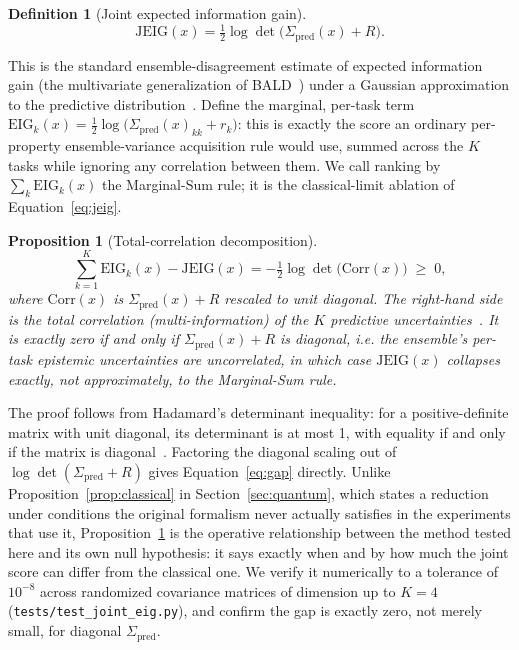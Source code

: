 \documentclass[10pt]{article}
\newtheorem{definition}{Definition}
\newtheorem{proposition}{Proposition}
\begin{document}
\begin{definition}[Joint expected information gain]\label{def:jeig}
\begin{equation}
\mathrm{JEIG}(x) = \tfrac{1}{2}\log\det\bigl(\Sigma_{\mathrm{pred}}(x) + R\bigr). \label{eq:jeig}
\end{equation}
\end{definition}
This is the standard ensemble-disagreement estimate of expected information gain (the multivariate generalization of BALD~\cite{houlsby2011bayesian}) under a Gaussian approximation to the predictive distribution~\cite{mackay1992information}. Define the marginal, per-task term $\mathrm{EIG}_k(x) = \tfrac{1}{2}\log\bigl(\Sigma_{\mathrm{pred}}(x)_{kk} + r_k\bigr)$: this is exactly the score an ordinary per-property ensemble-variance acquisition rule would use, summed across the $K$ tasks while ignoring any correlation between them. We call ranking by $\sum_k \mathrm{EIG}_k(x)$ the Marginal-Sum rule; it is the classical-limit ablation of Equation~\ref{eq:jeig}.

\begin{proposition}[Total-correlation decomposition]\label{prop:jeig}
\begin{equation}
\sum_{k=1}^K \mathrm{EIG}_k(x) - \mathrm{JEIG}(x) = -\tfrac{1}{2}\log\det\bigl(\mathrm{Corr}(x)\bigr) \;\ge\; 0, \label{eq:gap}
\end{equation}
where $\mathrm{Corr}(x)$ is $\Sigma_{\mathrm{pred}}(x)+R$ rescaled to unit diagonal. The right-hand side is the total correlation (multi-information) of the $K$ predictive uncertainties~\cite{watanabe1960information}. It is exactly zero if and only if $\Sigma_{\mathrm{pred}}(x)+R$ is diagonal, i.e. the ensemble's per-task epistemic uncertainties are uncorrelated, in which case $\mathrm{JEIG}(x)$ collapses exactly, not approximately, to the Marginal-Sum rule.
\end{proposition}

The proof follows from Hadamard's determinant inequality: for a positive-definite matrix with unit diagonal, its determinant is at most 1, with equality if and only if the matrix is diagonal~\cite{cover2006elements}. Factoring the diagonal scaling out of $\log\det(\Sigma_{\mathrm{pred}}+R)$ gives Equation~\ref{eq:gap} directly. Unlike Proposition~\ref{prop:classical} in Section~\ref{sec:quantum}, which states a reduction under conditions the original formalism never actually satisfies in the experiments that use it, Proposition~\ref{prop:jeig} is the operative relationship between the method tested here and its own null hypothesis: it says exactly when and by how much the joint score can differ from the classical one. We verify it numerically to a tolerance of $10^{-8}$ across randomized covariance matrices of dimension up to $K=4$ (\texttt{tests/test\_joint\_eig.py}), and confirm the gap is exactly zero, not merely small, for diagonal $\Sigma_{\mathrm{pred}}$.
\end{document}
